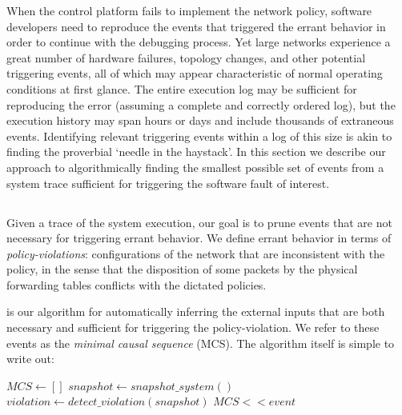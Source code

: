 When the control platform fails to implement the network policy, software
developers need to reproduce the events that triggered the errant behavior in
order to continue with the debugging process.
Yet large networks experience a great number of hardware failures, topology changes,
and other potential triggering events,
all of which may appear characteristic of normal operating
conditions at first glance. The entire
execution log may be sufficient for reproducing the error (assuming
a complete and correctly ordered log), but the execution history may span
hours or days and include thousands of extraneous events.
Identifying relevant triggering events within a log of this size is akin to finding
the proverbial `needle in the haystack'.
In this section we describe our approach to algorithmically finding the
smallest possible set of events from a system trace sufficient for triggering the
software fault of interest.


\subsection{\SIMULATOR{}}
\label{sec:causal_analysis}

Given a trace of the system execution, our goal is to prune events that are not
necessary for triggering
errant behavior. We define errant behavior in terms of {\em policy-violations}: 
configurations of the network that are inconsistent
with the policy, in the sense that the disposition of some packets by the
physical forwarding tables conflicts with the dictated policies.

\Simulator{} is our algorithm for automatically inferring the external inputs
that are both necessary and sufficient for triggering the policy-violation. We
refer to these events as the {\em minimal causal sequence} (MCS). The algorithm itself is
simple to write out:

\begin{algorithmic}
\State $MCS \gets []$
    \State $snapshot \gets snapshot\_system()$
    \State $violation \gets detect\_violation(snapshot)$
        \State $MCS << event$
    \EndIf
\EndFor
\end{algorithmic}

